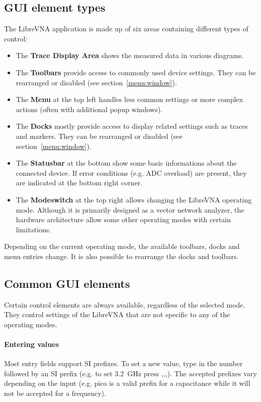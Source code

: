 \documentclass[a4paper,11pt]{article}
\newcommand{\vna}{LibreVNA}
\begin{document}
\subsection{GUI element types}
The \vna{} application is made up of six areas containing different types of control:
\begin{itemize}
\item The \textbf{Trace Display Area} shows the measured data in various diagrams.
\item The \textbf{Toolbars} provide access to commonly used device settings. They can be rearranged or disabled (see section~\ref{menu:window}).
\item The \textbf{Menu} at the top left handles less common settings or more complex actions (often with additional popup windows).
\item The \textbf{Docks} mostly provide access to display related settings such as traces and markers. They can be rearranged or disabled (see section~\ref{menu:window}).
\item The \textbf{Statusbar} at the bottom show some basic informations about the connected device. If error conditions (e.g. ADC overload) are present, they are indicated at the bottom right corner.
\item The \textbf{Modeswitch} at the top right allows changing the \vna{} operating mode. Although it is primarily designed as a vector network analyzer, the hardware architecture allow some other operating modes with certain limitations.
\end{itemize}
Depending on the current operating mode, the available toolbars, docks and menu entries change. It is also possible to rearrange the docks and toolbars.

\subsection{Common GUI elements}
Certain control elements are always available, regardless of the selected mode. They control settings of the \vna{} that are not specific to any of the operating modes.

\paragraph{Entering values}\hfill\newline
Most entry fields support SI prefixes. To set a new value, type in the number followed by an SI prefix (e.g. to set \SI{3.2}{\giga\hertz} press ,,,). The accepted prefixes vary depending on the input (e.g. pico is a valid prefix for a capacitance while it will not be accepted for a frequency). 
\end{document}
